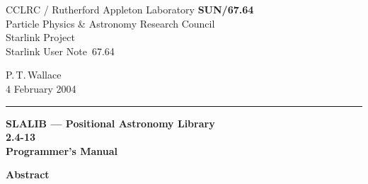 \documentclass[11pt,twoside]{article}
\newcommand{\stardoccategory}  {Starlink User Note}
\newcommand{\stardocinitials}  {SUN}
\newcommand{\stardocnumber}    {67.64}
\newcommand{\stardocauthors}   {P.\,T.\,Wallace}
\newcommand{\stardocdate}      {4 February 2004}
\newcommand{\stardoctitle}     {SLALIB --- Positional Astronomy Library}
\newcommand{\stardocversion}   {2.4-13}
\newcommand{\stardocmanual}    {Programmer's Manual}
\newcommand{\stardocname}{\stardocinitials /\stardocnumber}
\newenvironment{latexonly}{}{}
\begin{document}
\thispagestyle{empty}

\begin{latexonly}
   CCLRC / {\sc Rutherford Appleton Laboratory} \hfill {\bf \stardocname}\\
   {\large Particle Physics \& Astronomy Research Council}\\
   {\large Starlink Project\\}
   {\large \stardoccategory\ \stardocnumber}
   \begin{flushright}
   \stardocauthors\\
   \stardocdate
   \end{flushright}
   \vspace{-4mm}
   \rule{\textwidth}{0.5mm}
   \vspace{5mm}
   \begin{center}
   {\Huge\bf  \stardoctitle \\ [2.5ex]}
   {\LARGE\bf \stardocversion \\ [4ex]}
   {\Huge\bf  \stardocmanual}
   \end{center}
   \vspace{5mm}

   \vspace{10mm}
   \begin{center}
      {\Large\bf Abstract}
   \end{center}
\end{latexonly}
\end{document}
